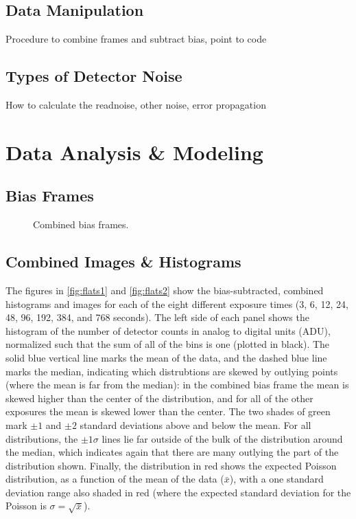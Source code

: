 \documentclass[preprint]{aastex62}
\begin{document}
\subsection{Data Manipulation}
Procedure to combine frames and subtract bias, point to code

\subsection{Types of Detector Noise}
How to calculate the readnoise, other noise, error propagation

\section{Data Analysis \& Modeling}
\subsection{Bias Frames}

\begin{figure}[ht]
\caption{Combined bias frames.} \label{fig:bias}
\end{figure}

\subsection{Combined Images \& Histograms}
The figures in \ref{fig:flats1} and \ref{fig:flats2} show the bias-subtracted, combined histograms and images for each of the eight different exposure times (3, 6, 12, 24, 48, 96, 192, 384, and 768 seconds). The left side of each panel shows the histogram of the number of detector counts in analog to digital units (ADU), normalized such that the sum of all of the bins is one (plotted in black). The solid blue vertical line marks the mean of the data, and the dashed blue line marks the median, indicating which distrubtions are skewed by outlying points (where the mean is far from the median): in the combined bias frame the mean is skewed higher than the center of the distribution, and for all of the other exposures the mean is skewed lower than the center. The two shades of green mark $\pm1$ and $\pm2$ standard deviations above and below the mean. For all distributions, the $\pm1\sigma$ lines lie far outside of the bulk of the distribution around the median, which indicates again that there are many outlying the part of the distribution shown. Finally, the distribution in red shows the expected Poisson distribution, as a function of the mean of the data ($\bar{x}$), with a one standard deviation range also shaded in red (where the expected standard deviation for the Poisson is $\sigma=\sqrt{\bar{x}}$).  
\end{document}
